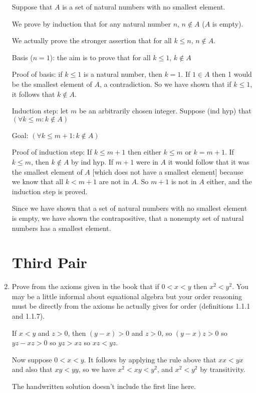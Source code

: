 \documentclass[12pt]{article}
\begin{document}
\begin{enumerate}
Suppose that $A$ is a set of natural numbers with no smallest element.

We prove by induction that for any natural number $n$, $n \not\in A$ ($A$ is empty).

We actually prove the stronger assertion that for all $k \leq n$, $n \not\in A$.

Basis ($n=1$):  the aim is to prove that for all $k \leq 1$, $k \not\in A$

Proof of basis:  if $k \leq 1$ is a natural number, then $k=1$.  If $1 \in A$ then 1 would be the smallest element of $A$, a contradiction.
So we have shown that if $k \leq 1$, it follows that $k \not\in A$.

Induction step:  let $m$ be an arbitrarily chosen integer.  Suppose (ind hyp) that $(\forall k \leq m:k \not\in A)$

Goal:  $(\forall k \leq m+1:k \not\in A)$

Proof of induction step:  If $k \leq m+1$ then either $k \leq m$ or $k=m+1$.  If $k \leq m$, then $k \not\in A$ by ind hyp.  If $m+1$ were in $A$ it would follow that it was the smallest element of $A$ [which does not have a smallest element] because we know that all $k <m+1$ are not in $A$.  So $m+1$ is not in $A$ either,
and the induction step is proved.

Since we have shown that a set of natural numbers with no smallest element is empty, we have shown the contrapositive, that a nonempty set of natural numbers has a smallest element.

\newpage

\section{Third Pair}

\item  Prove from the axioms given in the book that if $0<x<y$ then $x^2<y^2$.  You may be a little informal about equational algebra but your order reasoning must be directly from the axioms he actually gives for order (definitions 1.1.1 and 1.1.7).

If $x<y$ and $z>0$, then $(y-x)>0$ and $z>0$, so $(y-x)z>0$ so $yz-xz>0$ so $yz>xz$ so $xz<yz$.

Now suppose $0<x<y$.  It follows by applying the rule above that $xx<yx$ and also that $xy<yy$, so we have $x^2<xy<y^2$,
and $x^2<y^2$ by transitivity.

The handwritten solution doesn't include the first line here.


\end{enumerate}
\end{document}
